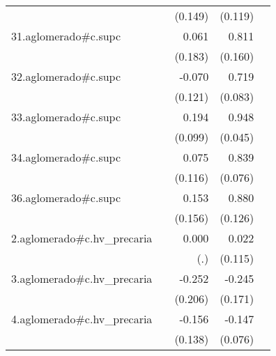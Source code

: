 {\begin{longtable}{l*{4}{D{.}{.}{-1}}}
            &                     &     (0.149)         &     (0.119)         &                     \\
\addlinespace
31.aglomerado#c.supc&                     &       0.061         &       0.811\sym{***}&                     \\
            &                     &     (0.183)         &     (0.160)         &                     \\
\addlinespace
32.aglomerado#c.supc&                     &      -0.070         &       0.719\sym{***}&                     \\
            &                     &     (0.121)         &     (0.083)         &                     \\
\addlinespace
33.aglomerado#c.supc&                     &       0.194\sym{*}  &       0.948\sym{***}&                     \\
            &                     &     (0.099)         &     (0.045)         &                     \\
\addlinespace
34.aglomerado#c.supc&                     &       0.075         &       0.839\sym{***}&                     \\
            &                     &     (0.116)         &     (0.076)         &                     \\
\addlinespace
36.aglomerado#c.supc&                     &       0.153         &       0.880\sym{***}&                     \\
            &                     &     (0.156)         &     (0.126)         &                     \\
\addlinespace
2.aglomerado#c.hv\_precaria&                     &       0.000         &       0.022         &                     \\
            &                     &         (.)         &     (0.115)         &                     \\
\addlinespace
3.aglomerado#c.hv\_precaria&                     &      -0.252         &      -0.245         &                     \\
            &                     &     (0.206)         &     (0.171)         &                     \\
\addlinespace
4.aglomerado#c.hv\_precaria&                     &      -0.156         &      -0.147         &                     \\
            &                     &     (0.138)         &     (0.076)         &                     \\

\end{longtable}}
